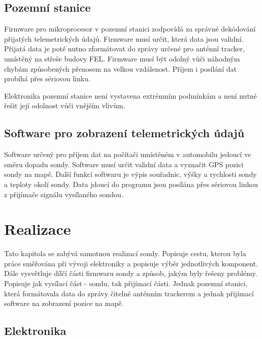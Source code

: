 \documentclass[twoside]{ctuthesis}
\theoremstyle{plain}
\theoremstyle{definition}
\theoremstyle{note}
\begin{document}
	\section{Pozemní stanice}
	\label{sec:navrh:pozemni_stanice}
	Firmware pro mikroprocesor v pozemní stanici zodpovídá za správné dekódování přijatých telemetrických údajů. Firmware musí určit, která data jsou validní. Přijatá data je poté nutno zformátovat do zprávy určené pro anténní tracker, umístěný na střeše budovy FEL. Firmware musí být odolný vůči náhodným chybám způsobených přenosem na velkou vzdálenost. Příjem i posílání dat probíhá přes sériovou linku. 

	Elektronika pozemní stanice není vystavena extrémním podmínkám a není nutné řešit její odolnost vůči vnějším vlivům. 
	

	\section{Software pro zobrazení telemetrických údajů}
	Software určený pro příjem dat na počítači umístěném v automobilu jedoucí ve směru dopadu sondy. Software musí určit validní data a vyznačit GPS pozici sondy na mapě. Další funkcí softwaru je výpis souřadnic, výšky a rychlosti sondy a teploty okolí sondy. Data jdoucí do programu jsou posílána přes sériovou linkou z přijímače signálu vysílaného sondou. 

	
	















\chapter{Realizace}
Tato kapitola se zabývá samotnou realizací sondy. Popisuje cestu, kterou byla práce směřována při vývoji elektroniky a popisuje výběr jednotlivých komponent. Dále vysvětluje dílčí části firmwaru sondy a způsob, jakým byly řešeny problémy. Popisuje jak vysílací část - sondu, tak přijímací části. Jednak pozemní stanici, která formátovala data do zprávy čitelné anténním trackerem a jednak přijímací software na zobrazení pozice na mapě.

	\section{Elektronika}
	
\end{document}
